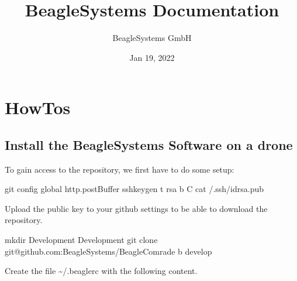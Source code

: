 \documentclass[letterpaper,10pt,english]{sphinxmanual}
\title{BeagleSystems Documentation}
\date{Jan 19, 2022}
\author{BeagleSystems GmbH}
\begin{document}
\pagestyle{empty}
\sphinxmaketitle
\pagestyle{plain}
\sphinxtableofcontents
\pagestyle{normal}
\label{\detokenize{index::doc}}



\chapter{HowTos}
\label{\detokenize{source/howtos:howtos}}\label{\detokenize{source/howtos::doc}}

\section{Install the BeagleSystems Software on a drone}
\label{\detokenize{source/howtos/install:install-the-beaglesystems-software-on-a-drone}}\label{\detokenize{source/howtos/install::doc}}
To gain access to the repository, we first have to do some setup:

\begin{sphinxVerbatim}[commandchars=\\\{\}]
\PYGZdl{} git config \PYGZhy{}\PYGZhy{}global http.postBuffer 
\PYGZdl{} ssh\PYGZhy{}keygen \PYGZhy{}t rsa \PYGZhy{}b  \PYGZhy{}C 
\PYGZdl{} cat \PYGZti{}/.ssh/id\PYGZus{}rsa.pub
\end{sphinxVerbatim}

Upload the public key to your github settings to be able to download the repository.

\begin{sphinxVerbatim}[commandchars=\\\{\}]
\PYGZdl{} mkdir Development
\PYGZdl{}  Development
\PYGZdl{} git clone git@github.com:BeagleSystems/BeagleComrade \PYGZhy{}b develop
\end{sphinxVerbatim}

Create the file \textasciitilde{}/.beaglerc with the following content.
\end{document}
